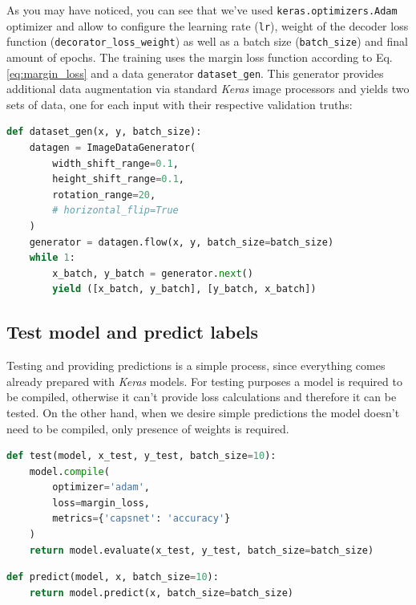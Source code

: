 As you may have noticed, you can see that we've used \texttt{keras.optimizers.Adam} optimizer and allow to configure the learning rate (\texttt{lr}), weight of the decoder loss function (\texttt{decorator\_loss\_weight}) as well as a batch size (\texttt{batch\_size}) and final amount of epochs. The training uses the margin loss function according to Eq.\,\ref{eq:margin_loss} and a data generator \texttt{dataset\_gen}. This generator provides additional data augmentation via standard \textit{Keras} image processors and yields two sets of data, one for each input with their respective validation truths:

\begin{lstlisting}[language=Python, caption=Data generator example]
def dataset_gen(x, y, batch_size):
    datagen = ImageDataGenerator(
        width_shift_range=0.1,
        height_shift_range=0.1,
        rotation_range=20,
        # horizontal_flip=True
    )
    generator = datagen.flow(x, y, batch_size=batch_size)
    while 1:
        x_batch, y_batch = generator.next()
        yield ([x_batch, y_batch], [y_batch, x_batch])
\end{lstlisting}

\subsection{Test model and predict labels}

Testing and providing predictions is a simple process, since everything comes already prepared with \textit{Keras} models. For testing purposes a model is required to be compiled, otherwise it can't provide loss calculations and therefore it can be tested. On the other hand, when we desire simple predictions the model doesn't need to be compiled, only presence of weights is required.

\begin{lstlisting}[language=Python, caption=Test run of a \textit{Keras} model example]
def test(model, x_test, y_test, batch_size=10):
    model.compile(
        optimizer='adam',
        loss=margin_loss,
        metrics={'capsnet': 'accuracy'}
    )
    return model.evaluate(x_test, y_test, batch_size=batch_size)
\end{lstlisting}

\begin{lstlisting}[language=Python, caption=Prediction example for a given model]
def predict(model, x, batch_size=10):
    return model.predict(x, batch_size=batch_size)
\end{lstlisting}

